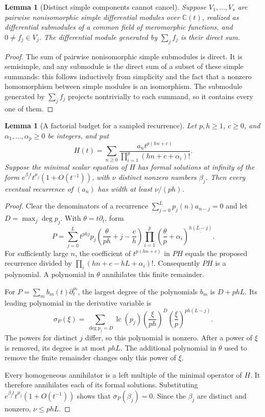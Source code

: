 \documentclass[11pt,a4paper]{article}
\newtheorem{lemma}[theorem]{Lemma}
\theoremstyle{definition}
\theoremstyle{remark}
\newcommand{\C}{\mathbb C}
\numberwithin{equation}{section}
\begin{document}
\begin{lemma}[Distinct simple components cannot cancel]
\label{B:up:simple-filter}
Suppose $V_1,\ldots,V_s$ are pairwise nonisomorphic simple
differential modules over $\C(t)$, realized as differential
submodules of a common field of meromorphic functions, and
$0\ne f_j\in V_j$.  The differential module generated by
$\sum_j f_j$ is their direct sum.
\end{lemma}
\begin{proof}
The sum of pairwise nonisomorphic simple submodules is direct.
It is semisimple, and any submodule is the direct sum of a subset
of these simple summands: this follows inductively from simplicity
and the fact that a nonzero homomorphism between simple modules
is an isomorphism.  The submodule generated by $\sum_jf_j$ projects
nontrivially to each summand, so it contains every one of them.
\end{proof}

\begin{lemma}[A factorial budget for a sampled recurrence]
\label{B:up:sample-budget}
Let $p,h\ge1$, $c\ge0$, and $\alpha_1,\ldots,\alpha_p\ge0$ be
integers, and put
\[
 H(t)=\sum_{n\ge0}
       \frac{a_n t^{p(hn+c)}}
       {\prod_{i=1}^{p}(hn+c+\alpha_i)!}.
\]
Suppose the minimal scalar equation of $H$ has formal solutions
at infinity of the form
$e^{\beta_jt}t^{\mu_j}(1+O(t^{-1}))$, with $\nu$ distinct nonzero
numbers $\beta_j$.  Then every eventual recurrence of $(a_n)$
has width at least $\nu/(ph)$.
\end{lemma}
\begin{proof}
Clear the denominators of a recurrence
$\sum_{j=0}^{L}p_j(n)a_{n-j}=0$ and let
$D=\max_j\deg p_j$.  With $\theta=t\partial_t$, form
\[
 P=\sum_{j=0}^{L}t^{phj}
 p_j\left(\frac{\theta}{ph}+j-\frac ch\right)
 \prod_{i=1}^{p}
 \left(\frac\theta p+\alpha_i\right)^{\underline{h(L-j)}}.
\]
For sufficiently large $n$, the coefficient of
$t^{p(hn+c)}$ in $PH$ equals the proposed recurrence divided by
$\prod_i(hn+c-hL+\alpha_i)!$.  Consequently $PH$ is a polynomial.
A polynomial in $\theta$ annihilates this finite remainder.

For $P=\sum_m b_m(t)\partial_t^m$, the largest degree of the
polynomials $b_m$ is $D+phL$.  Its leading polynomial in the
derivative variable is
\[
 \sigma_P(\xi)=
 \sum_{\deg p_j=D}\operatorname{lc}(p_j)
 \left(\frac\xi{ph}\right)^D
 \left(\frac\xi p\right)^{ph(L-j)}.
\]
The powers for distinct $j$ differ, so this polynomial is nonzero.
After a power of $\xi$ is removed, its degree is at most $phL$.
The additional polynomial in $\theta$ used to remove the finite
remainder changes only this power of $\xi$.

Every homogeneous annihilator is a left multiple of the minimal
operator of $H$.  It therefore annihilates each of its formal
solutions.  Substituting
$e^{\beta_jt}t^{\mu_j}(1+O(t^{-1}))$ shows that
$\sigma_P(\beta_j)=0$.  Since the $\beta_j$ are distinct and
nonzero, $\nu\le phL$.
\end{proof}
\end{document}
